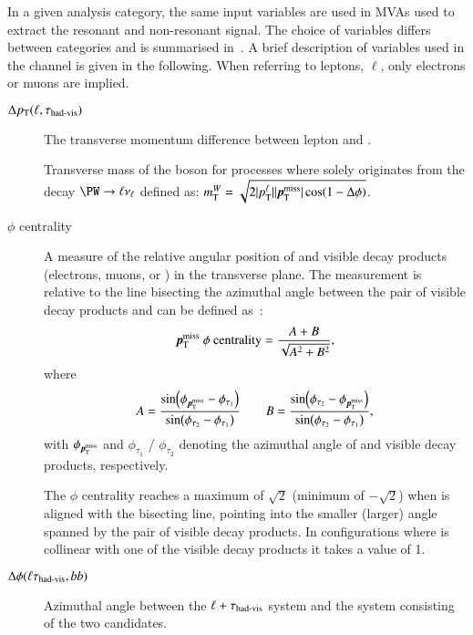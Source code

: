 In a given analysis category, the same input variables are used in
MVAs used to extract the resonant and non-resonant \HH signal. The
choice of variables differs between categories and is summarised
in~. A brief description of variables used in
the \lephad channel is given in the following. When referring to
leptons, $\ell$, only electrons or muons are implied.\nopagebreak
\begin{description}

\item[$\Delta p_{\text{T}}(\ell, \tau_{\text{had-vis}})$] The transverse momentum
  difference between lepton and \tauhadvis.

\item[\mTW] Transverse mass of the \PW boson for processes where
  \pTmiss solely originates from the decay $\PW \ra \ell \nu_\ell$ defined as:
  $\mTW = \sqrt{2 |\pT^{\ell}| |\pTmiss| \cos(1 - \Delta\phi)}$.

\item[\pTmiss $\phi$ centrality] A measure of the relative angular
  position of \pTmiss and visible \taulepton decay products
  (electrons, muons, or \tauhadvis) in the transverse plane. The
  measurement is relative to the line bisecting the azimuthal angle
  between the pair of visible \taulepton decay products and can be
  defined as~\cite{HIGG-2013-32, HIGG-2016-16-witherratum}:
  \begin{align*}
    \pTmiss\text{ }\phi\text{ centrality} = \frac{A + B}{\sqrt{A^2 + B^2}} \text{,}
  \end{align*}
  where
  \begin{align*}
    A = \frac{\sin(\phi_{\pTmiss} - \phi_{\tau_1})}{\sin(\phi_{\tau_2} - \phi_{\tau_1})} \qquad B = \frac{\sin(\phi_{\tau_2} - \phi_{\pTmiss})}{\sin(\phi_{\tau_2} - \phi_{\tau_1})} \text{,}
  \end{align*}
  with $\phi_{\pTmiss}$ and $\phi_{\tau_1}$ / $\phi_{\tau_2}$ denoting
  the azimuthal angle of \pTmiss and visible \taulepton decay
  products, respectively.

  The \pTmiss $\phi$ centrality reaches a maximum of $\sqrt{2}$
  (minimum of $-\sqrt{2}$) when \pTmiss is aligned with the bisecting
  line, pointing into the smaller (larger) angle spanned by the pair
  of visible \taulepton decay products. In configurations where
  \pTmiss is collinear with one of the visible \taulepton decay
  products it takes a value of 1.

\item[$\Delta\phi(\ell\tau_{\text{had-vis}}, bb)$] Azimuthal angle between the
  $\ell + \tau_{\text{had-vis}}$ system and the system consisting of the two
  \bjet candidates.


\end{description}
